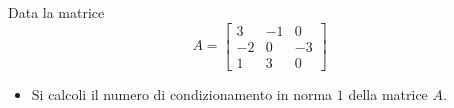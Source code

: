 Data la matrice
\bigskip
\[
A=\left[
\begin{array}{ccc}
3 & -1 & 0 \\
-2 & 0 & -3\\
1 & 3 & 0
\end{array}\right]
\]

\begin{itemize}
\item Si calcoli il numero di condizionamento in norma $1$ della matrice $A$.
\end{itemize}
